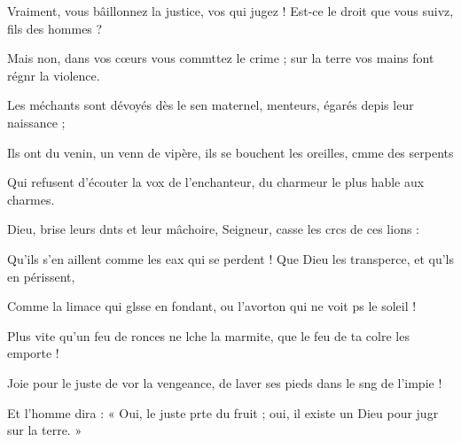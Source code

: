 \item Vraiment, vous bâillonnez la justice, vos qui jugez !\psstar{} Est-ce le droit que vous suivz, fils des hommes ?
\item Mais non, dans vos cœurs vous commttez le crime ;\psstar{} sur la terre vos mains font régnr la violence.
\item Les méchants sont dévoyés dès le sen maternel,\psstar{} menteurs, égarés depis leur naissance ;
\item Ils ont du venin, un venn de vipère,\psstar{} ils se bouchent les oreilles, cmme des serpents
\item Qui refusent d'écouter la vox de l'enchanteur,\psstar{} du charmeur le plus hable aux charmes.
\item Dieu, brise leurs dnts et leur mâchoire,\psstar{} Seigneur, casse les crcs de ces lions :
\item Qu'ils s'en aillent comme les eax qui se perdent !\psstar{} Que Dieu les transperce, et qu'ls en périssent,
\item Comme la limace qui glsse en fondant,\psstar{} ou l'avorton qui ne voit ps le soleil !
\item Plus vite qu'un feu de ronces ne lche la marmite,\psstar{} que le feu de ta colre les emporte !
\item Joie pour le juste de vor la vengeance,\psstar{} de laver ses pieds dans le sng de l'impie !
\item Et l'homme dira : « Oui, le juste prte du fruit ;\psstar{} oui, il existe un Dieu pour jugr sur la terre. »